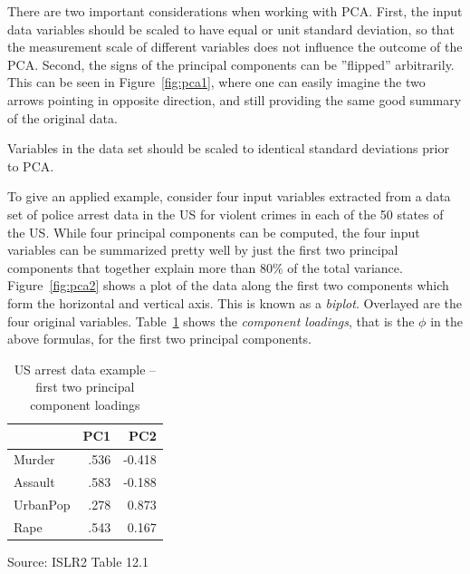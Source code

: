 There are two important considerations when working with PCA. First, the input data variables should be scaled to have equal or unit standard deviation, so that the measurement scale of different variables does not influence the outcome of the PCA. Second, the signs of the principal components can be ''flipped'' arbitrarily. This can be seen in Figure~\ref{fig:pca1}, where one can easily imagine the two arrows pointing in opposite direction, and still providing the same good summary of the original data. 

\begin{tcolorbox}[colback=alert]
Variables in the data set should be scaled to identical standard deviations prior to PCA.
\end{tcolorbox}

To give an applied example, consider four input variables extracted from a data set of police arrest data in the US for violent crimes in each of the 50 states of the US. While four principal components can be computed, the four input variables can be summarized pretty well by just the first two principal components that together explain more than 80\% of the total variance. Figure~\ref{fig:pca2} shows a plot of the data along the first two components which form the horizontal and vertical axis. This is known as a \emph{biplot}. Overlayed are the four original variables. Table~\ref{tab:pca} shows the \emph{component loadings}, that is the $\phi$ in the above formulas, for the first two principal components. 

\begin{table}[b]
\renewcommand{\arraystretch}{1.2}
\centering
\begin{tabular}{l|r|r}
          &  PC1 & PC2 \\ \hline
Murder    & .536  & -0.418 \\
Assault   & .583  & -0.188 \\
UrbanPop  & .278  & 0.873 \\ 
Rape      & .543 & 0.167 \\ \hline
\end{tabular}

\scriptsize \vspace{\baselineskip} Source: ISLR2 Table 12.1
\caption{US arrest data example -- first two principal component loadings}
\label{tab:pca}
\end{table}

